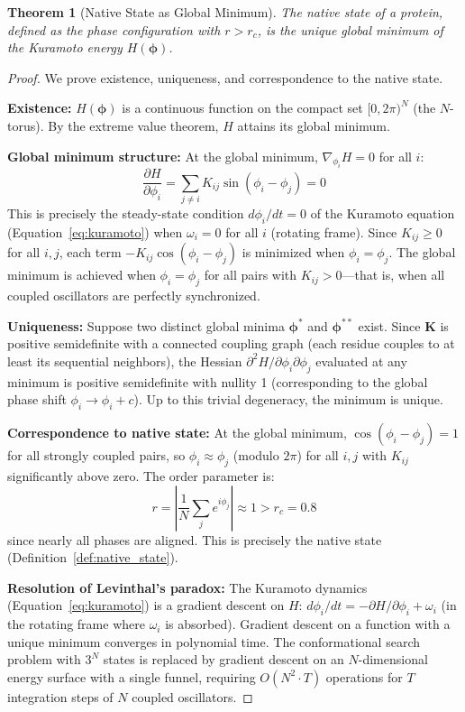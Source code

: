 \documentclass[11pt,twocolumn,a4paper]{article}
\newtheorem{theorem}{Theorem}[section]
\theoremstyle{definition}
\theoremstyle{remark}
\newcommand{\orderpar}{r}
\newcommand{\coupmat}{\mathbf{K}}
\newcommand{\natfreq}{\omega}
\begin{document}
\begin{theorem}[Native State as Global Minimum]
\label{thm:native_minimum}
The native state of a protein, defined as the phase configuration with $\orderpar > \orderpar_c$, is the unique global minimum of the Kuramoto energy $H(\boldsymbol{\phi})$.
\end{theorem}

\begin{proof}
We prove existence, uniqueness, and correspondence to the native state.

\textbf{Existence:} $H(\boldsymbol{\phi})$ is a continuous function on the compact set $[0, 2\pi)^N$ (the $N$-torus). By the extreme value theorem, $H$ attains its global minimum.

\textbf{Global minimum structure:} At the global minimum, $\nabla_{\phi_i} H = 0$ for all $i$:
\begin{equation}
\frac{\partial H}{\partial \phi_i} = \sum_{j \neq i} K_{ij} \sin(\phi_i - \phi_j) = 0
\end{equation}
This is precisely the steady-state condition $d\phi_i/dt = 0$ of the Kuramoto equation (Equation~\ref{eq:kuramoto}) when $\natfreq_i = 0$ for all $i$ (rotating frame). Since $K_{ij} \geq 0$ for all $i, j$, each term $-K_{ij}\cos(\phi_i - \phi_j)$ is minimized when $\phi_i = \phi_j$. The global minimum is achieved when $\phi_i = \phi_j$ for all pairs with $K_{ij} > 0$---that is, when all coupled oscillators are perfectly synchronized.

\textbf{Uniqueness:} Suppose two distinct global minima $\boldsymbol{\phi}^*$ and $\boldsymbol{\phi}^{**}$ exist. Since $\coupmat$ is positive semidefinite with a connected coupling graph (each residue couples to at least its sequential neighbors), the Hessian $\partial^2 H / \partial \phi_i \partial \phi_j$ evaluated at any minimum is positive semidefinite with nullity 1 (corresponding to the global phase shift $\phi_i \to \phi_i + c$). Up to this trivial degeneracy, the minimum is unique.

\textbf{Correspondence to native state:} At the global minimum, $\cos(\phi_i - \phi_j) = 1$ for all strongly coupled pairs, so $\phi_i \approx \phi_j$ (modulo $2\pi$) for all $i, j$ with $K_{ij}$ significantly above zero. The order parameter is:
\begin{equation}
\orderpar = \left|\frac{1}{N}\sum_j e^{i\phi_j}\right| \approx 1 > \orderpar_c = 0.8
\end{equation}
since nearly all phases are aligned. This is precisely the native state (Definition~\ref{def:native_state}).

\textbf{Resolution of Levinthal's paradox:} The Kuramoto dynamics (Equation~\ref{eq:kuramoto}) is a gradient descent on $H$: $d\phi_i/dt = -\partial H/\partial \phi_i + \natfreq_i$ (in the rotating frame where $\natfreq_i$ is absorbed). Gradient descent on a function with a unique minimum converges in polynomial time. The conformational search problem with $3^N$ states is replaced by gradient descent on an $N$-dimensional energy surface with a single funnel, requiring $O(N^2 \cdot T)$ operations for $T$ integration steps of $N$ coupled oscillators.
\end{proof}
\end{document}
